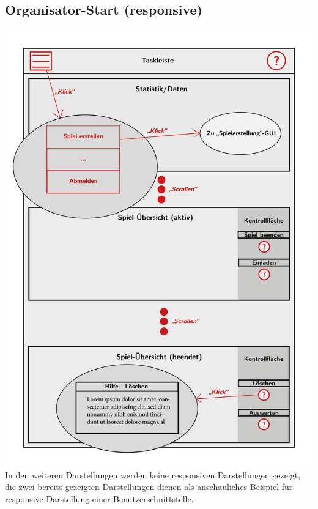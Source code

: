 \documentclass[a4paper]{scrreprt}
\begin{document}
    \subsection{Organisator-Start (responsive)}
    \centering
    \includegraphics[width=\textwidth]{../pictures/3_Organisator(responsive).jpg}
    In den weiteren Darstellungen werden keine responsiven Darstellungen gezeigt, die zwei bereits gezeigten Darstellungen dienen als anschauliches Beispiel für
    responsive Darstellung einer Benutzerschnittstelle.
\end{document}
